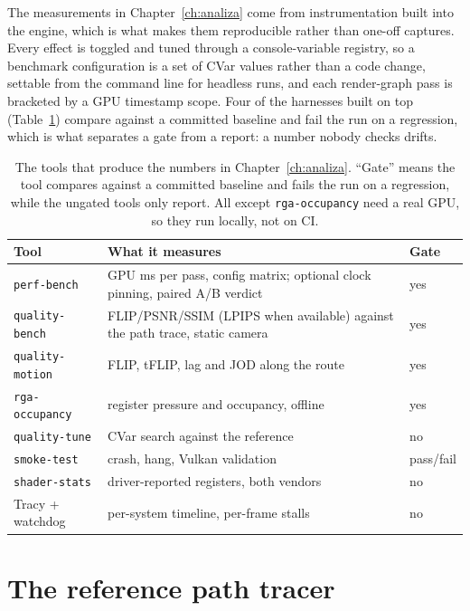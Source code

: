 The measurements in Chapter~\ref{ch:analiza} come from instrumentation built into the engine, which
is what makes them reproducible rather than one-off captures. Every effect is toggled and tuned
through a console-variable registry, so a benchmark configuration is a set of CVar values rather than
a code change, settable from the command line for headless runs, and each render-graph pass is
bracketed by a GPU timestamp scope. Four of the harnesses built on top (Table~\ref{tab:tooling})
compare against a committed baseline and fail the run on a regression, which is what separates a gate
from a report: a number nobody checks drifts.

\begin{table}[tbp]
\caption[Measurement tooling]{The tools that produce the numbers in Chapter~\ref{ch:analiza}.
``Gate'' means the tool compares against a committed baseline and fails the run on a regression,
while the ungated tools only report. All except \texttt{rga-occupancy} need a real GPU, so they run
locally, not on CI.}
\label{tab:tooling}
\centering
\begin{tabular}{lll}
\toprule
Tool & What it measures & Gate \\
\midrule
\texttt{perf-bench}     & GPU ms per pass, config matrix; optional clock pinning, paired A/B verdict & yes \\
\texttt{quality-bench}  & FLIP/PSNR/SSIM (LPIPS when available) against the path trace, static camera & yes \\
\texttt{quality-motion} & FLIP, tFLIP, lag and JOD along the route & yes \\
\texttt{rga-occupancy}  & register pressure and occupancy, offline & yes \\
\texttt{quality-tune}   & CVar search against the reference & no \\
\texttt{smoke-test}     & crash, hang, Vulkan validation & pass/fail \\
\texttt{shader-stats}   & driver-reported registers, both vendors & no \\
Tracy + watchdog        & per-system timeline, per-frame stalls & no \\
\bottomrule
\end{tabular}
\end{table}

\section{The reference path tracer}
\label{sec:pathtracer}

